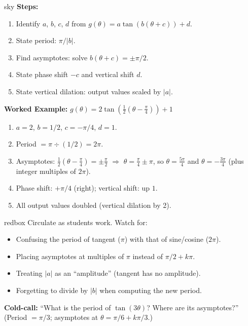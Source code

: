 \documentclass[10pt]{article}
\begin{document}
\begin{skillbox}{sky}
  \textbf{Steps:}
  \begin{enumerate}
    \item Identify $a$, $b$, $c$, $d$ from $g(\theta)=a\tan(b(\theta+c))+d$.
    \item State period: $\pi/|b|$.
    \item Find asymptotes: solve $b(\theta+c)=\pm\pi/2$.
    \item State phase shift $-c$ and vertical shift $d$.
    \item State vertical dilation: output values scaled by $|a|$.
  \end{enumerate}

  \textbf{Worked Example:} $g(\theta)=2\tan\!\left(\tfrac{1}{2}(\theta-\tfrac{\pi}{4})\right)+1$

  \begin{enumerate}
    \item $a=2$, $b=1/2$, $c=-\pi/4$, $d=1$.
    \item Period $= \pi\div(1/2) = 2\pi$.
    \item Asymptotes: $\tfrac{1}{2}(\theta-\tfrac{\pi}{4})=\pm\tfrac{\pi}{2}$
          $\Rightarrow$ $\theta=\tfrac{\pi}{4}\pm\pi$, so
          $\theta=\tfrac{5\pi}{4}$ and $\theta=-\tfrac{3\pi}{4}$
          (plus integer multiples of $2\pi$).
    \item Phase shift: $+\pi/4$ (right); vertical shift: up $1$.
    \item All output values doubled (vertical dilation by 2).
  \end{enumerate}
\end{skillbox}

\begin{skillbox}{redbox}
  Circulate as students work. Watch for:
  \begin{itemize}
    \item Confusing the period of tangent ($\pi$) with that of sine/cosine ($2\pi$).
    \item Placing asymptotes at multiples of $\pi$ instead of $\pi/2+k\pi$.
    \item Treating $|a|$ as an ``amplitude'' (tangent has no amplitude).
    \item Forgetting to divide by $|b|$ when computing the new period.
  \end{itemize}

  \textbf{Cold-call:} ``What is the period of $\tan(3\theta)$?
  Where are its asymptotes?''
  \quad (Period $= \pi/3$; asymptotes at $\theta = \pi/6 + k\pi/3$.)
\end{skillbox}
\end{document}
